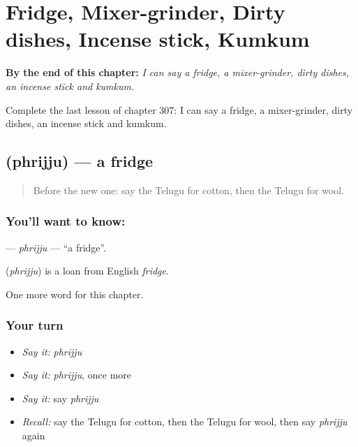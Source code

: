 
\chapter{Fridge, Mixer-grinder, Dirty dishes, Incense stick, Kumkum}
\label{ch:te-fridge-mixer-grinder-dirty-dishes-incense-stick-kumkum}

\begin{chapteropening}
\textbf{By the end of this chapter:} \emph{I can say a fridge, a mixer-grinder, dirty dishes, an incense stick and kumkum.}

Complete the last lesson of chapter 307: I can say a fridge, a mixer-grinder, dirty dishes, an incense stick and kumkum.
\end{chapteropening}

\section[\texorpdfstring{\te{ఫ్రిజ్జు} (phrijju)}{ఫ్రిజ్జు (phrijju)}]{ (phrijju) — a fridge}

\label{lesson:TE-C307-phrijju}



\begin{quote}
Before the new one: say the Telugu for cotton, then the Telugu for wool.
\end{quote}

\subsection*{You'll want to know: }
\textbf{} — \emph{phrijju} — \textquotedblleft{}a fridge\textquotedblright{}.

\begin{cousinweb}
\textbf{} (\emph{phrijju}) is a loan from English \emph{fridge}.
\end{cousinweb}

\begin{grammarlens}[title={What you've built}]
One more word for this chapter.
\end{grammarlens}

\subsection*{Your turn}
\begin{itemize}
\raggedright
  \item \emph{Say it:} \emph{phrijju}
  \item \emph{Say it:} \emph{phrijju}, once more
  \item \emph{Say it:} say \emph{phrijju}
  \item \emph{Recall:} say the Telugu for cotton, then the Telugu for wool, then say \emph{phrijju} again
\end{itemize}

